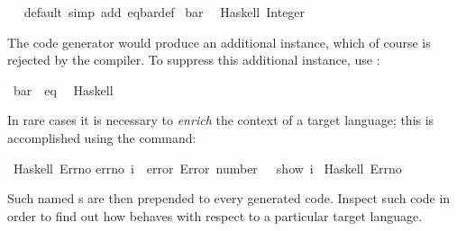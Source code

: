 \begin{isabellebody}
\isanewline
{}\isamarkupfalse%
\ \isamarkupfalse%
\ default\ {\isacharparenleft}simp\ add{\isacharcolon}\ eq{\isacharunderscore}bar{\isacharunderscore}def{\isacharparenright}\isanewline
\isanewline
{}\isamarkupfalse%
%
\endisatagquote
{\isafoldquote}%
%
\isadelimquote
%
\endisadelimquote
\isanewline
%
\isadelimquotett
\isanewline
%
\endisadelimquotett
%
\isatagquotett
{}\isamarkupfalse%
\ bar\isanewline
\ \ {\isacharparenleft}Haskell\ {\isachardoublequoteopen}Integer{\isachardoublequoteclose}{\isacharparenright}%
\endisatagquotett
{\isafoldquotett}%
%
\isadelimquotett
%
\endisadelimquotett
%
\begin{isamarkuptext}%
\noindent The code generator would produce
  an additional instance, which of course is rejected by the 
  compiler.
  To suppress this additional instance, use
  :%
\end{isamarkuptext}%
\isamarkuptrue%
%
\isadelimquotett
%
\endisadelimquotett
%
\isatagquotett
{}\isamarkupfalse%
\ bar\ {\isacharcolon}{\isacharcolon}\ eq\isanewline
\ \ {\isacharparenleft}Haskell\ {\isacharminus}{\isacharparenright}%
\endisatagquotett
{\isafoldquotett}%
%
\isadelimquotett
%
\endisadelimquotett
%
\isamarkuptrue%
%
\begin{isamarkuptext}%
In rare cases it is necessary to \emph{enrich} the context of a
  target language;  this is accomplished using the \hyperlink{command.code-include}{\mbox{}}
  command:%
\end{isamarkuptext}%
\isamarkuptrue%
%
\isadelimquotett
%
\endisadelimquotett
%
\isatagquotett
{}\isamarkupfalse%
\ Haskell\ {\isachardoublequoteopen}Errno{\isachardoublequoteclose}\isanewline
{\isacharverbatimopen}errno\ i\ {\isacharequal}\ error\ {\isacharparenleft}{\isachardoublequote}Error\ number{\isacharcolon}\ {\isachardoublequote}\ {\isacharplus}{\isacharplus}\ show\ i{\isacharparenright}{\isacharverbatimclose}\isanewline
\isanewline
{}\isamarkupfalse%
\ Haskell\ Errno%
\endisatagquotett
{\isafoldquotett}%
%
\isadelimquotett
%
\endisadelimquotett
%
\begin{isamarkuptext}%
\noindent Such named s are then prepended to every generated code.
  Inspect such code in order to find out how \hyperlink{command.code-include}{\mbox{}} behaves
  with respect to a particular target language.%
\end{isamarkuptext}%
\isamarkuptrue%
%
\isadelimtheory
%
\endisadelimtheory
%
\isatagtheory
{}\isamarkupfalse%
%
\endisatagtheory
{\isafoldtheory}%
%
\isadelimtheory
%
\endisadelimtheory
\isanewline
\end{isabellebody}%
